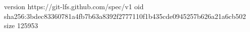 version https://git-lfs.github.com/spec/v1
oid sha256:3bdec83360781a4fb7b63a8392f2777110f1b435cde0945257b626a21a6cb502
size 125953
